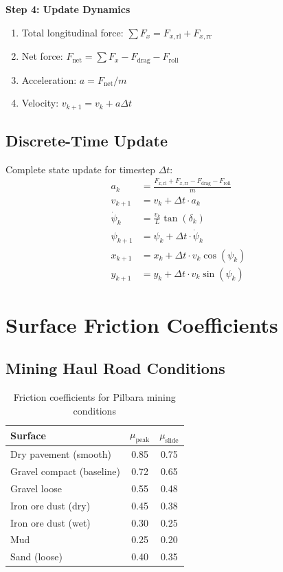 \documentclass[11pt,a4paper]{article}
\begin{document}
\textbf{Step 4: Update Dynamics}
\begin{enumerate}
    \item Total longitudinal force: $\sum F_x = F_{x,\text{rl}} + F_{x,\text{rr}}$
    \item Net force: $F_{\text{net}} = \sum F_x - F_{\text{drag}} - F_{\text{roll}}$
    \item Acceleration: $a = F_{\text{net}} / m$
    \item Velocity: $v_{k+1} = v_k + a \Delta t$
\end{enumerate}

\subsection{Discrete-Time Update}

Complete state update for timestep $\Delta t$:
\begin{align}
a_k &= \frac{F_{x,\text{rl}} + F_{x,\text{rr}} - F_{\text{drag}} - F_{\text{roll}}}{m} \\
v_{k+1} &= v_k + \Delta t \cdot a_k \\
\dot{\psi}_k &= \frac{v_k}{L} \tan(\delta_k) \\
\psi_{k+1} &= \psi_k + \Delta t \cdot \dot{\psi}_k \\
x_{k+1} &= x_k + \Delta t \cdot v_k \cos(\psi_k) \\
y_{k+1} &= y_k + \Delta t \cdot v_k \sin(\psi_k)
\end{align}

\section{Surface Friction Coefficients}

\subsection{Mining Haul Road Conditions}

\begin{table}[h]
\centering
\begin{tabular}{lcc}
\toprule
\textbf{Surface} & $\mu_{\text{peak}}$ & $\mu_{\text{slide}}$ \\
\midrule
Dry pavement (smooth) & 0.85 & 0.75 \\
Gravel compact (baseline) & 0.72 & 0.65 \\
Gravel loose & 0.55 & 0.48 \\
Iron ore dust (dry) & 0.45 & 0.38 \\
Iron ore dust (wet) & 0.30 & 0.25 \\
Mud & 0.25 & 0.20 \\
Sand (loose) & 0.40 & 0.35 \\
\bottomrule
\end{tabular}
\caption{Friction coefficients for Pilbara mining conditions}
\end{table}
\end{document}
